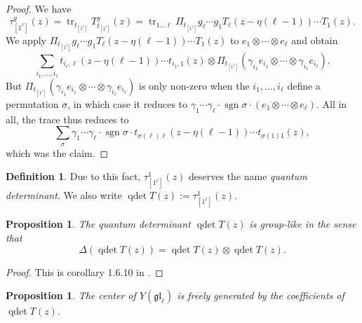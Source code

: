 \documentclass[11pt]{report}
\newtheorem{prop}[theorem]{Proposition}
\theoremstyle{definition}
\newtheorem{definition}[theorem]{Definition}
\theoremstyle{remark}
\theoremstyle{remark}
\begin{document}
\begin{proof}
We have
\begin{equation*}
\tau_{[1^\ell]}^g(z) = \operatorname{tr}_{t_{[1^\ell]}} T_{t_{[1^\ell]}}^g(z) = \operatorname{tr}_{1...\ell} \Pi_{t_{[1^\ell]}} g_\ell \cdots g_1 T_\ell(z-\eta(\ell-1)) \cdots T_1(z).
\end{equation*}
We apply $\Pi_{t_{[1^\ell]}} g_\ell \cdots g_1 T_\ell(z-\eta(\ell-1)) \cdots T_1(z)$ to $e_1 \otimes \cdots \otimes e_\ell$ and obtain
\begin{equation*}
\sum_{i_1,...,i_\ell} t_{i_\ell,\ell}(z-\eta(\ell-1)) \cdots t_{i_1,1}(z) \otimes \Pi_{t_{[1^\ell]}} (\gamma_{i_1} e_{i_1} \otimes \cdots \otimes \gamma_{i_\ell} e_{i_\ell}).
\end{equation*}
But $\Pi_{t_{[1^\ell]}} (\gamma_{i_1} e_{i_1} \otimes \cdots \otimes \gamma_{i_\ell} e_{i_\ell})$ is only non-zero when the $i_1,...,i_\ell$ define a permutation $\sigma$, in which case it reduces to $\gamma_1 \cdots \gamma_\ell \cdot \operatorname{sgn} \sigma \cdot (e_1 \otimes \cdots \otimes e_\ell)$. All in all, the trace thus reduces to
\begin{equation*}
\sum_\sigma \gamma_1 \cdots \gamma_\ell \cdot \operatorname{sgn} \sigma \cdot t_{\sigma(\ell)\ell}(z-\eta(\ell-1)) \cdots t_{\sigma(1)1}(z),
\end{equation*}
which was the claim.
\end{proof}

\begin{definition}
Due to this fact, $\tau_{[1^\ell]}^1(z)$ deserves the name \emph{quantum determinant}. We also write $\operatorname{qdet} T(z) := \tau_{[1^\ell]}^1(z)$.
\end{definition}

\begin{prop}\label{prop:quantumDetGroupLike}
The quantum determinant $\operatorname{qdet} T(z)$ is group-like in the sense that
\begin{equation*}
\Delta(\operatorname{qdet} T(z)) = \operatorname{qdet} T(z) \otimes \operatorname{qdet} T(z).
\end{equation*}
\end{prop}

\begin{proof}
This is corollary 1.6.10 in \cite{book:molev}.
\end{proof}

\begin{prop}
The center of $Y(\mathfrak{gl}_\ell)$ is freely generated by the coefficients of $\operatorname{qdet} T(z)$.
\end{prop}
\end{document}
